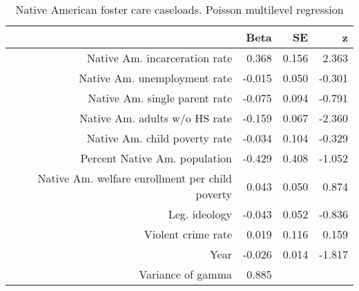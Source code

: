 \begin{table}[ht]
\centering
\begin{tabular}{rrrr}
  \hline
 & Beta & SE & z \\ 
  \hline
Native Am. incarceration rate & 0.368 & 0.156 & 2.363 \\ 
  Native Am. unemployment rate & -0.015 & 0.050 & -0.301 \\ 
  Native Am. single parent rate & -0.075 & 0.094 & -0.791 \\ 
  Native Am. adults w/o HS rate & -0.159 & 0.067 & -2.360 \\ 
  Native Am. child poverty rate & -0.034 & 0.104 & -0.329 \\ 
  Percent Native Am. population & -0.429 & 0.408 & -1.052 \\ 
  Native Am. welfare enrollment per child poverty & 0.043 & 0.050 & 0.874 \\ 
  Leg. ideology & -0.043 & 0.052 & -0.836 \\ 
  Violent crime rate & 0.019 & 0.116 & 0.159 \\ 
  Year & -0.026 & 0.014 & -1.817 \\ 
  Variance of gamma & 0.885 &  &  \\ 
   \hline
\end{tabular}
\caption{Native American foster care caseloads. Poisson multilevel regression} 
\label{a.c.tab}
\end{table}
